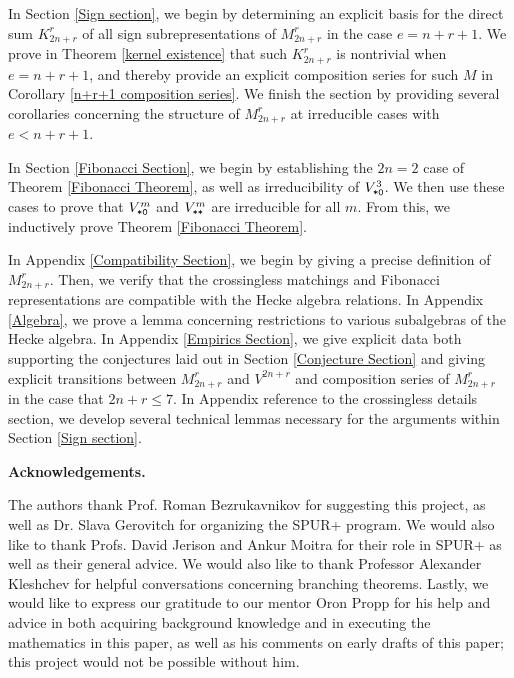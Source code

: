 \documentclass{amsart}
\newcommand{\fakesubsection}[1]{
    \vspace{7pt}
    \noindent \textbf{#1.}
  }
\begin{document}
  \vspace{5pt}
  In Section \ref{Sign section}, we begin by determining an explicit basis for the direct sum $K_{2n + r}^r$ of all sign subrepresentations of $M_{2n + r}^r$ in the case $e = n + r + 1$.
  We prove in Theorem \ref{kernel existence} that such $K_{2n + r}^r$ is nontrivial when $e = n + r + 1$, and thereby provide an explicit composition series for such $M$ in Corollary \ref{n+r+1 composition series}.
  We finish the section by providing several corollaries concerning the structure of $M_{2n + r}^r$ at irreducible cases with $e < n + r + 1$.

  \vspace{5pt}
  In Section \ref{Fibonacci Section}, we begin by establishing the $2n = 2$ case of Theorem \ref{Fibonacci Theorem}, as well as irreducibility of $V^3_{\texttt{*}\texttt{0}}$.
  We then use these cases to prove that $V^m_{\texttt{*}\texttt{0}}$ and $V^m_{\texttt{*}\texttt{*}}$ are irreducible for all $m$.
  From this, we inductively prove Theorem \ref{Fibonacci Theorem}.

  \vspace{5pt}
  In Appendix \ref{Compatibility Section}, we begin by giving a precise definition of $M_{2n + r}^r$.
  Then, we verify that the crossingless matchings and Fibonacci representations are compatible with the Hecke algebra relations.
  In Appendix \ref{Algebra}, we prove a lemma concerning restrictions to various subalgebras of the Hecke algebra.
  In Appendix \ref{Empirics Section}, we give explicit data both supporting the conjectures laid out in Section \ref{Conjecture Section} and giving explicit transitions between $M_{2n + r}^r$ and $V^{2n + r}$ and composition series of $M_{2n + r}^r$ in the case that $2n + r \leq 7$.
  In Appendix {\color{orange} reference to the crossingless details section}, we develop several technical lemmas necessary for the arguments within Section \ref{Sign section}.

  \fakesubsection{Acknowledgements}
  The authors thank Prof. Roman Bezrukavnikov for suggesting this project, as well as Dr. Slava Gerovitch for organizing the SPUR+ program.
  We would also like to thank Profs. David Jerison and Ankur Moitra for their role in SPUR+ as well as their general advice.
  We would also like to thank Professor Alexander Kleshchev for helpful conversations concerning branching theorems.
  Lastly, we would like to express our gratitude to our mentor Oron Propp for his help and advice in both acquiring background knowledge and in executing the mathematics in this paper, as well as his comments on early drafts of this paper;
  this project would not be possible without him.
   
\end{document}
